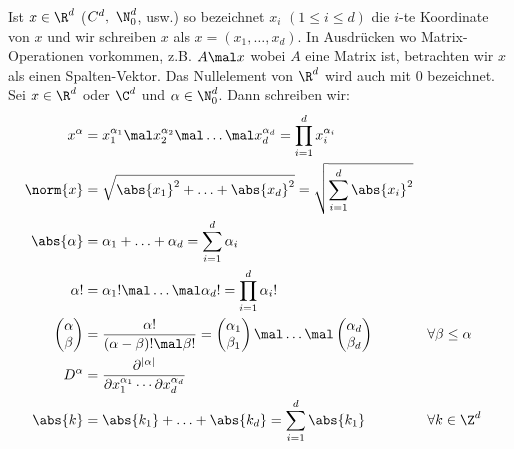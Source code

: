 \begin{notationnr}\enter
	Ist $x\in\R^d$ ($C^d,~\N_0^d$, usw.) so bezeichnet $x_i$ $(1\leq i\leq d)$ die $i$-te Koordinate von $x$ und wir schreiben $x$ als $x=(x_1,\ldots,x_d)$.
	In Ausdrücken wo Matrix-Operationen vorkommen, z.B. $A\mal x$ wobei $A$ eine Matrix ist, betrachten wir $x$ als einen Spalten-Vektor.
	Das Nullelement von $\R^d$ wird auch mit 0 bezeichnet.
	Sei $x\in\R^d$ oder $\C^d$ und $\alpha\in\N_0^d$.
	Dann schreiben wir:
	\begin{align*}
		x^\alpha&=x_1^{\alpha_1}\mal x_2^{\alpha_2}\mal\ldots\mal x_d^{\alpha_d}=\prod\limits_{i=1}^d x_i^{\alpha_i}\\
		\norm{x}&=\sqrt{\abs{x_1}^2+\ldots+\abs{x_d}^2}=\sqrt{\sum\limits_{i=1}^d\abs{x_i}^2}\\
		\abs{\alpha}&=\alpha_1+\ldots+\alpha_d=\sum\limits_{i=1}^d\alpha_i\\
		\alpha!&=\alpha_1!\mal\ldots\mal\alpha_d!=\prod\limits_{i=1}^d\alpha_i!\\
		\begin{pmatrix}
			\alpha\\
			\beta
		\end{pmatrix}&=\frac{\alpha!}{(\alpha-\beta)!\mal\beta!}=
		\begin{pmatrix}
			\alpha_1\\
			\beta_1
		\end{pmatrix}\mal\ldots\mal
		\begin{pmatrix}
			\alpha_d\\
			\beta_d
		\end{pmatrix}&\forall& \beta\leq\alpha\\
		D^\alpha&=\frac{\partial^{|\alpha|}}{\partial x_1^{\alpha_1}\cdots\partial x_d^{\alpha_d}}\\
		\abs{k}&=\abs{k_1}+\ldots+\abs{k_d}=\sum\limits_{i=1}^d\abs{k_1}&\forall& k\in\Z^d
	\end{align*}
\end{notationnr}

